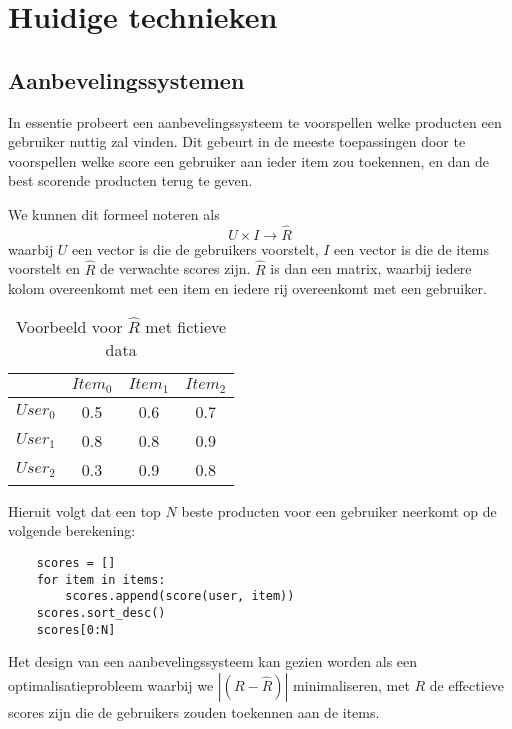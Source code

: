 \chapter{Huidige technieken}
\label{chap:huidige_technieken}
\section{Aanbevelingssystemen}
\label{sec:huidige_technieken_aanbevelingssystemen}
In essentie probeert een aanbevelingssysteem te voorspellen welke producten een gebruiker nuttig zal vinden. Dit gebeurt in de meeste toepassingen \cite{overzicht_technieken} door te voorspellen welke score een gebruiker aan ieder item zou toekennen, en dan de best scorende producten terug te geven. 

We kunnen dit formeel noteren als
\begin{equation}
U \times I \rightarrow \hat{R}
\label{def:chap2_aanbevelingssysteem_formeel}    
\end{equation}
waarbij $U$ een vector is die de gebruikers voorstelt, $I$ een vector is die de items voorstelt en $\hat{R}$ de verwachte scores zijn. \cite{cursus_hs2} $\hat{R}$ is dan een matrix, waarbij iedere kolom overeenkomt met een item en iedere rij overeenkomt met een gebruiker.

\begin{table}[H]
\centering
\begin{tabular}{c|ccc}
        & $Item_0$ & $Item_1$ & $Item_2$ \\ \hline
$User_0$ & 0.5     & 0.6     & 0.7     \\
$User_1$ & 0.8     & 0.8     & 0.9     \\
$User_2$ & 0.3     & 0.9     & 0.8    
\end{tabular}
\caption{Voorbeeld voor $\hat{R}$ met fictieve data}
\end{table}

Hieruit volgt dat een top $N$ beste producten voor een gebruiker neerkomt op de volgende berekening:
\begin{lstlisting}
    scores = []
    for item in items:
        scores.append(score(user, item))
    scores.sort_desc()
    scores[0:N]
\end{lstlisting}

Het design van een aanbevelingssysteem kan gezien worden als een optimalisatieprobleem waarbij we $|(R - \hat{R})|$ minimaliseren, met $R$ de effectieve scores zijn die de gebruikers zouden toekennen aan de items.

